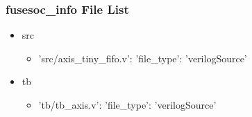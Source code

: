 \subsubsection{fusesoc\_info File List}
\begin{itemize}
\item src
	\begin{itemize}
	\item {'src/axis\_tiny\_fifo.v': {'file\_type': 'verilogSource'}}
	\end{itemize}
\item tb
	\begin{itemize}
	\item {'tb/tb\_axis.v': {'file\_type': 'verilogSource'}}
	\end{itemize}
\end{itemize}
